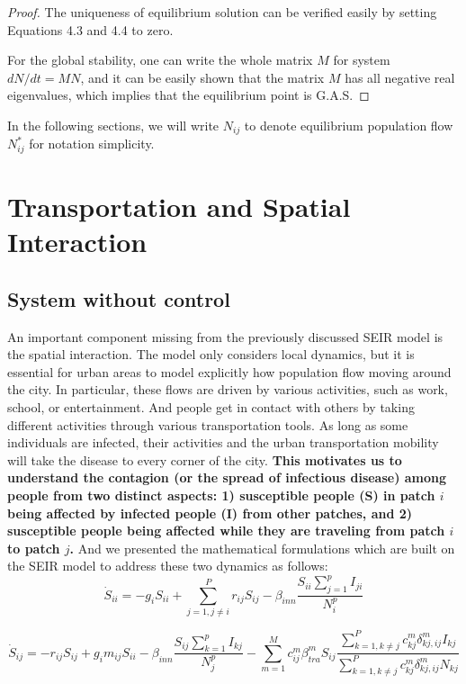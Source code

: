 \documentclass[review]{elsarticle}
\theoremstyle{plain}
\theoremstyle{definition}
\theoremstyle{remark}
\numberwithin{equation}{section}
\theoremstyle{remark}
\begin{document}
\begin{proof}
	The uniqueness of equilibrium solution can be verified easily by setting Equations 4.3 and 4.4 to zero. 
	
	For the global stability, one can write the whole matrix $M$ for system $dN/dt=MN$, and it can be easily shown that the matrix $M$ has all negative real eigenvalues, which implies that the equilibrium point is G.A.S. 
\end{proof}
In the following sections, we will write $N_{ij}$ to denote equilibrium population flow $N_{ij}^*$ for notation simplicity.
\section{Transportation and Spatial Interaction}
\subsection{System without control}
An important component missing from the previously discussed SEIR model is the spatial interaction. The model only considers local dynamics, but it is essential for urban areas to model explicitly how population flow moving around the city. In particular, these flows are driven by various activities, such as work, school, or entertainment. And people get in contact with others by taking different activities through various transportation tools. As long as some individuals are infected, their activities and the urban transportation mobility will take the disease to every corner of the city. \textbf{This motivates us to understand the contagion (or the spread of infectious disease) among people from two distinct aspects: 1) susceptible people (S) in patch $i$ being affected by infected people (I) from other patches, and 2) susceptible people being affected while they are traveling from patch $i$ to patch $j$.} And we presented the mathematical formulations which are built on the SEIR model to address these two dynamics as follows:
\begin{equation}
\dot{S}_{ii}=-g_{i}S_{ii}+\sum_{j=1,j\neq i}^{P}r_{ij}S_{ij}-\beta_{inn}\frac{S_{ii}\sum_{j=1}^{p}I_{ji}}{N_i^p}
\end{equation}

\begin{equation}
\dot{S}_{ij}=-r_{ij}S_{ij}+g_i m_{ij}S_{ii}-\beta_{inn}\frac{S_{ij}\sum_{k=1}^{p}I_{kj}}{N_j^p}-\sum_{m=1}^M c_{ij}^{m} \beta_{tra}^m S_{ij} \frac{\sum_{k=1,k\neq j}^P c_{kj}^m \delta_{kj,ij}^m I_{kj}}{\sum_{k=1,k\neq j}^P c_{kj}^m \delta_{kj,ij}^m N_{kj}}
\end{equation}
\end{document}
